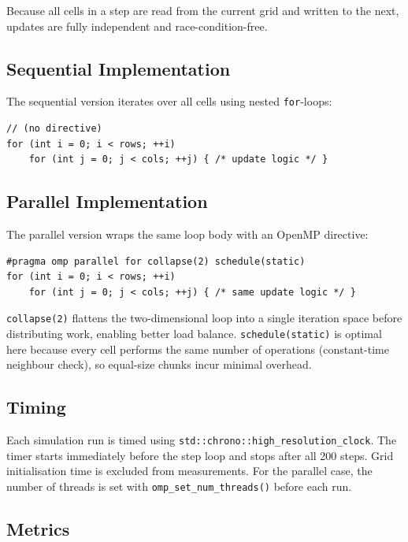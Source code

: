 \documentclass[12pt,a4paper]{article}
\begin{document}
Because all cells in a step are read from the current grid and written to the next,
updates are fully independent and race-condition-free.

\subsection{Sequential Implementation}

The sequential version iterates over all cells using nested \texttt{for}-loops:

\begin{lstlisting}
// (no directive)
for (int i = 0; i < rows; ++i)
    for (int j = 0; j < cols; ++j) { /* update logic */ }
\end{lstlisting}

\subsection{Parallel Implementation}

The parallel version wraps the same loop body with an OpenMP directive:

\begin{lstlisting}
#pragma omp parallel for collapse(2) schedule(static)
for (int i = 0; i < rows; ++i)
    for (int j = 0; j < cols; ++j) { /* same update logic */ }
\end{lstlisting}

\texttt{collapse(2)} flattens the two-dimensional loop into a single iteration space
before distributing work, enabling better load balance. \texttt{schedule(static)} is
optimal here because every cell performs the same number of operations
(constant-time neighbour check), so equal-size chunks incur minimal overhead.

\subsection{Timing}

Each simulation run is timed using \texttt{std::chrono::high\_resolution\_clock}.
The timer starts immediately before the step loop and stops after all 200 steps.
Grid initialisation time is excluded from measurements. For the parallel case, the
number of threads is set with \texttt{omp\_set\_num\_threads()} before each run.

\subsection{Metrics}
\end{document}
